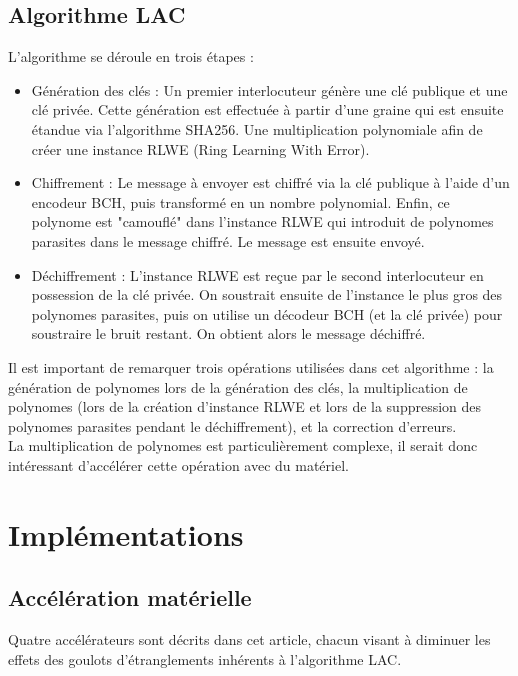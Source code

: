 \documentclass[10pt,a4paper]{article}
\begin{document}
\subsection{Algorithme LAC}
L'algorithme se déroule en trois étapes :
\begin{itemize}
    \item Génération des clés : Un premier interlocuteur génère une clé publique et une clé privée. Cette génération est effectuée à partir d'une graine qui est ensuite étandue via l'algorithme
SHA256. Une multiplication polynomiale afin de créer une instance RLWE (Ring Learning With Error).
    \item Chiffrement : Le message à envoyer est chiffré via la clé publique à l'aide d'un encodeur BCH, puis transformé en un nombre polynomial. Enfin, ce polynome est "camouflé" dans l'instance 
RLWE qui introduit de polynomes parasites dans le message chiffré. Le message est ensuite envoyé.
    \item Déchiffrement : L'instance RLWE est reçue par le second interlocuteur en possession de la clé privée. On soustrait ensuite de l'instance le plus gros des polynomes parasites, puis on 
utilise un décodeur BCH (et la clé privée) pour soustraire le bruit restant. On obtient alors le message déchiffré.
\end{itemize}
Il est important de remarquer trois opérations utilisées dans cet algorithme : la génération de polynomes lors de la génération des clés, la multiplication de polynomes (lors de la création d'instance 
RLWE et lors de la suppression des polynomes parasites pendant le déchiffrement), et la correction d'erreurs.\\
La multiplication de polynomes est particulièrement complexe, il serait donc intéressant d'accélérer cette opération avec du matériel.

\section{Implémentations}
\subsection{Accélération matérielle}
Quatre accélérateurs sont décrits dans cet article, chacun visant à diminuer les effets des goulots d'étranglements inhérents à l'algorithme LAC.
\end{document}
